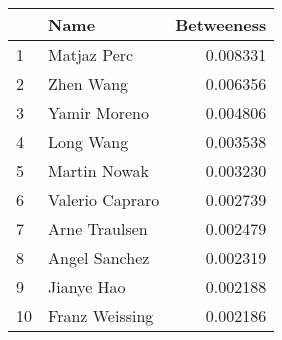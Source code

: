 \begin{tabular}{llr}
\toprule
{} &             Name &  Betweeness \\
\midrule
1  &      Matjaz Perc &    0.008331 \\
2  &        Zhen Wang &    0.006356 \\
3  &     Yamir Moreno &    0.004806 \\
4  &        Long Wang &    0.003538 \\
5  &     Martin Nowak &    0.003230 \\
6  &  Valerio Capraro &    0.002739 \\
7  &    Arne Traulsen &    0.002479 \\
8  &    Angel Sanchez &    0.002319 \\
9  &       Jianye Hao &    0.002188 \\
10 &   Franz Weissing &    0.002186 \\
\bottomrule
\end{tabular}
